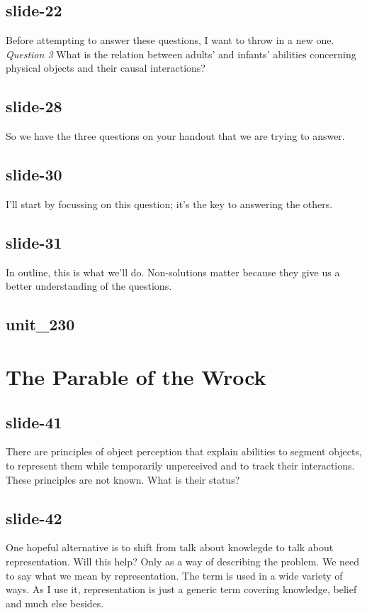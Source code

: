 \documentclass[12pt,\papersize]{extarticle}
\begin{document}
 
\subsection{slide-22}
Before attempting to answer these questions, I want to throw in a new one.
\emph{Question 3} What is the relation between adults’ and infants’ abilities concerning physical objects and their causal interactions?
 
 
\subsection{slide-28}
So we have the three questions on your handout that we are trying to answer.
 
 
\subsection{slide-30}
I'll start by focussing on this question; it's the key to answering the others.
 
 
\subsection{slide-31}
In outline, this is what we'll do.
Non-solutions matter because they give us a better understanding of the questions.
 
 
\subsection{unit\_230}
 
\section{The Parable of the Wrock}
 
 
\subsection{slide-41}
There are principles of object perception that explain abilities to segment objects, to represent them while temporarily unperceived and to track their interactions.
These principles are not known. What is their status?
 
 
\subsection{slide-42}
One hopeful alternative is to shift from talk about knowlegde to talk about representation.
Will this help?
Only as a way of describing the problem.
We need to say what we mean by representation.
The term is used in a wide variety of ways.
As I use it, representation is just a generic term covering knowledge, belief and much else besides.
 
\end{document}
